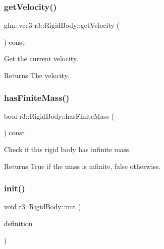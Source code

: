 \subsubsection{\texorpdfstring{get\+Velocity()}{getVelocity()}}
{\footnotesize\ttfamily glm\+::vec3 r3\+::\+Rigid\+Body\+::get\+Velocity (\begin{DoxyParamCaption}{ }\end{DoxyParamCaption}) const}



Get the current velocity. 

\begin{DoxyReturn}{Returns}
The velocity. 
\end{DoxyReturn}
\mbox{\label{classr3_1_1_rigid_body_a4e2a5b4dd423c75199fb0a4fb2ae078f}} 
\subsubsection{\texorpdfstring{has\+Finite\+Mass()}{hasFiniteMass()}}
{\footnotesize\ttfamily bool r3\+::\+Rigid\+Body\+::has\+Finite\+Mass (\begin{DoxyParamCaption}{ }\end{DoxyParamCaption}) const}



Check if this rigid body has infinite mass. 

\begin{DoxyReturn}{Returns}
True if the mass is infinite, false otherwise. 
\end{DoxyReturn}
\mbox{\label{classr3_1_1_rigid_body_aa617fb4da3d5aeec43e04983765f7db6}} 
\subsubsection{\texorpdfstring{init()}{init()}}
{\footnotesize\ttfamily void r3\+::\+Rigid\+Body\+::init (\begin{DoxyParamCaption}\item[{const \mbox{\hyperlink{structr3_1_1_rigid_body_def}{Rigid\+Body\+Def}} \&}]{definition }\end{DoxyParamCaption})}



